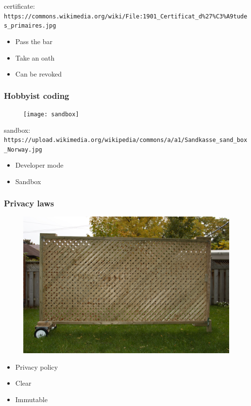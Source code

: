 certificate: \verb|https://commons.wikimedia.org/wiki/File:1901_Certificat_d%27%C3%A9tudes_primaires.jpg|

\begin{itemize}
\item Pass the bar
\item Take an oath
\item Can be revoked
\end{itemize}

\begin{frame}[fragile]
\frametitle{Hobbyist coding}

\begin{figure}
\texttt{[image: sandbox]}
\end{figure}

\end{frame}

sandbox: \verb|https://upload.wikimedia.org/wikipedia/commons/a/a1/Sandkasse_sand_box_Norway.jpg|

\begin{itemize}
\item Developer mode
\item Sandbox
\end{itemize}



\begin{frame}[fragile]
\frametitle{Privacy laws}

\begin{figure}
\includegraphics[scale=0.3]{screen}
\end{figure}

\end{frame}


\begin{itemize}
\item Privacy policy
\item Clear
\item Immutable
\end{itemize}


